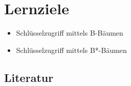 \section*{Lernziele}
\begin{itemize}
	\item Schlüsselzugriff mittels B-Bäumen
	\item Schlüsselzugriff mittels B*-Bäumen
\end{itemize}

\begin{normalText}
\section*{Literatur}



\end{normalText}
